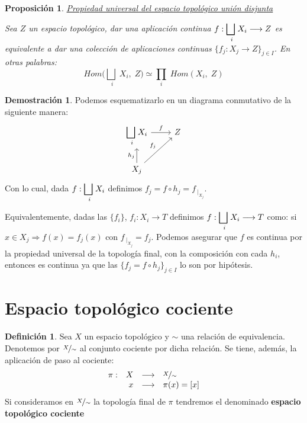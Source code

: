 \documentclass[12pt,twoside]{report}
\theoremstyle{azul}
\theoremstyle{azul2}
\theoremstyle{plain}
\newtheorem*{prop}{Proposición}
\theoremstyle{definition}
\newtheorem*{defi}{Definición}
\newtheorem*{dem}{Demostración}
\theoremstyle{remark}
\begin{document}
\begin{prop}\underline{Propiedad universal del espacio topológico unión disjunta}

Sea $Z$ un espacio topológico, dar una aplicación continua $f: \underset{i}{\mathlarger{\bigsqcup} \;} X_i \longrightarrow Z$ es equivalente a dar una colección de aplicaciones continuas $\{f_j: X_j \longrightarrow Z\}_{j \in I}$. En otras palabras:
$$Hom\big( \underset{i}{\bigsqcup \;} X_i, \; Z \big) \simeq \underset{i}{\prod} \; Hom(X_i, \; Z)$$
\end{prop}
\begin{dem}
Podemos esquematizarlo en un diagrama conmutativo de la siguiente manera:
$$\begin{tikzcd}
\underset{i}{\mathlarger{\bigsqcup} \;} X_i  \arrow{r}{f} & Z \\
X_j \arrow{u}{h_j} \arrow{ru}{f_j} 
\end{tikzcd}
$$ 
Con lo cual, dada $f: \underset{i}{\mathlarger{\bigsqcup} \;} X_i$ definimos $f_j = f \circ h_j = f_{\: |_{X_j}}$. 

Equivalentemente, dadas las $\{f_i\}$, $f_i: X_i\longrightarrow T$ definimos $f:\underset{i}{\mathlarger{\bigsqcup} \;} X_i \longrightarrow T$ como: si $x\in X_j \Rightarrow f(x)=f_j(x)$ con $f_{\: |_{X_j}}=f_j$. Podemos asegurar que $f$ es continua por la propiedad universal de la topología final, con la composición con cada $h_i$, entonces es continua ya que las $\{f_j=f \circ h_j\}_{j \in I}$ lo son por hipótesis.   
\end{dem}

\section{Espacio topológico cociente}
\begin{defi}
Sea $X$ un espacio topológico y $\sim$ una relación de equivalencia. Denotemos por $\mathlarger{\nicefrac{X}{\sim }}$ al conjunto cociente por dicha relación. Se tiene, además, la aplicación de paso al cociente:
$$\begin{array}{rrcl}
     \pi : & X & \longrightarrow & \mathlarger{\nicefrac{X}{\sim }}  \\
     & x & \longrightarrow & \pi(x)=[x]
\end{array}$$
Si consideramos en $\mathlarger{\nicefrac{X}{\sim }}$ la topología final de $\pi$ tendremos el denominado \textbf{espacio topológico cociente}
\end{defi}
\end{document}
